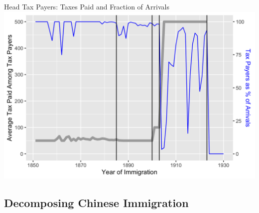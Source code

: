 \documentclass[pdf]{beamer}
\begin{document}
\begin{frame}{Head Tax Payers: Taxes Paid and Fraction of Arrivals}
    \includegraphics[width = \textwidth]{../../figs/taxbyyear.png}
\end{frame}

\subsection{Decomposing Chinese Immigration}
\end{document}

